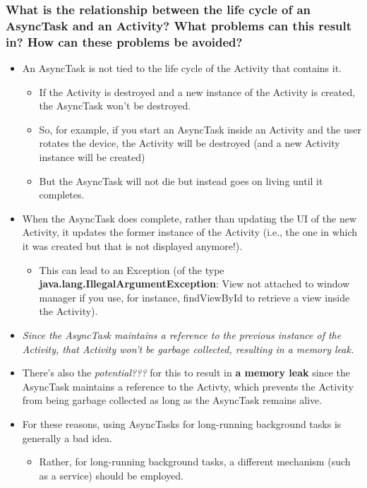 \documentclass[9pt, b5paper]{article}
\begin{document}
\subsubsection{What is the relationship between the life cycle of an AsyncTask and an Activity? What problems can this result in? How can these problems be avoided?}
\label{sec-1-2-14}
\begin{itemize}
\item An AsyncTask is not tied to the life cycle of the Activity that contains it.
\begin{itemize}
\item If the Activity is destroyed and a new instance of the Activity is created, the AsyncTask won't be destroyed.
\item So, for example, if you start an AsyncTask inside an Activity and the user rotates the device, the Activity will be destroyed (and a new Activity instance will be created)
\item But the AsyncTask will not die but instead goes on living until it completes.
\end{itemize}
\item When the AsyncTask does complete, rather than updating the UI of the new Activity, it updates the former instance of the Activity (i.e., the one in which it was created but that is not displayed anymore!). 
\begin{itemize}
\item This can lead to an Exception (of the type \textbf{java.lang.IllegalArgumentException}: View not attached to window manager if you use, for instance, findViewById to retrieve a view inside the Activity).
\end{itemize}
\item \emph{Since the AsyncTask maintains a reference to the previous instance of the Activity, that Activity won't be garbage collected, resulting in a memory leak.}
\item There's also the \emph{potential???} for this to result in \textbf{a memory leak} since the AsyncTask maintains a reference to the Activty, which prevents the Activity from being garbage collected as long as the AsyncTask remains alive.
\item For these reasons, using AsyncTasks for long-running background tasks is generally a bad idea. 
\begin{itemize}
\item Rather, for long-running background tasks, a different mechanism (such as a service) should be employed.
\end{itemize}
\end{itemize}
\end{document}

